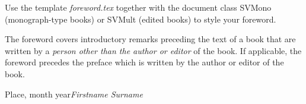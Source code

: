 %
%

\foreword

Use the template \textit{foreword.tex} together with the document class SVMono (monograph-type books) or SVMult (edited books) to style your foreword. 

The foreword covers introductory remarks preceding the text of a book that are written by a \textit{person other than the author or editor} of the book. If applicable, the foreword precedes the preface which is written by the author or editor of the book.


\vspace{\baselineskip}
\begin{flushright}\noindent
Place, month year\hfill {\it Firstname  Surname}\\
\end{flushright}


